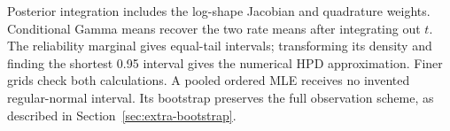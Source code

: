 Posterior integration includes the log-shape Jacobian and quadrature weights. Conditional Gamma means recover the two rate means after integrating out $t$. The reliability marginal gives equal-tail intervals; transforming its density and finding the shortest 0.95 interval gives the numerical HPD approximation. Finer grids check both calculations. A pooled ordered MLE receives no invented regular-normal interval. Its bootstrap preserves the full observation scheme, as described in Section~\ref{sec:extra-bootstrap}.
\FloatBarrier
